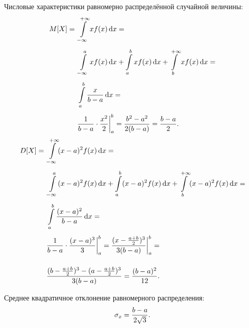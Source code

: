 \documentclass[a4paper]{article}
\newcommand{\sqrtt}[1]{\sqrt{\vphantom{qb} #1}}
\begin{document}
                    Числовые характеристики равномерно распределённой случайной величины:
                    \begin{equation*}
                        \begin{aligned}
                            M[X] = ~& \int\limits_{-\infty}^{+\infty} x f(x) \dif x = \\[1.0ex]
                            & \int\limits_{-\infty}^{a} x f(x) \dif x +
                                \int\limits_{a}^{b} x f(x) \dif x +
                                \int\limits_{b}^{+\infty} x f(x) \dif x = \\[1.0ex]
                            & \int\limits_{a}^{b} \frac{x}{b - a} \dif x = \\[1.0ex]
                            & \frac{1}{b - a} \cdot \frac{x^2}{2} \bigg|_{a}^{b} =
                                \frac{b^2 - a^2}{2 (b - a)} = \frac{b - a}{2} .
                        \end{aligned}
                    \end{equation*}
                    \begin{equation*}
                        \begin{aligned}
                            D[X] = ~& \int\limits_{-\infty}^{+\infty}
                                (x - a)^2 f(x) \dif x = \\[1.0ex]
                            & \int\limits_{-\infty}^{a} (x - a)^2 f(x) \dif x +
                                \int\limits_{a}^{b} (x - a)^2 f(x) \dif x +
                                \int\limits_{b}^{+\infty} (x - a)^2 f(x) \dif x = \\[1.0ex]
                            & \int\limits_{a}^{b} \frac{(x - a)^2}{b - a} \dif x = \\[1.0ex]
                            & \frac{1}{b - a} \cdot \frac{(x - a)^3}{3} \bigg|_{a}^{b} =
                                \frac{(x - \frac{a + b}{2})^3}{3 (b - a)}
                                \bigg|_{a}^{b} = \\[3.0ex]
                            & \frac{(b - \frac{a + b}{2})^3 -
                                (a - \frac{a + b}{2})^3}{3 (b - a)} =
                                \frac{(b - a)^2}{12} .
                        \end{aligned}
                    \end{equation*}

                    Среднее квадратичное отклонение равномерного распределения:
                    \begin{equation*}
                        \sigma_x = \frac{b - a}{2 \sqrtt{3}} .
                    \end{equation*}
\end{document}

